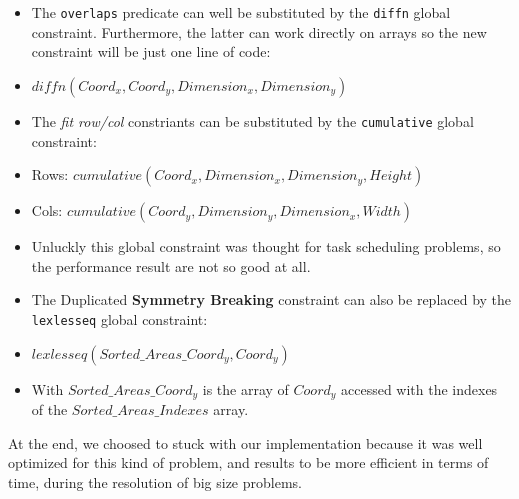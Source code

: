 \begin{itemize}
    \item The \texttt{overlaps} predicate can well be substituted by the \texttt{diffn} global constraint.
            Furthermore, the latter can work directly on arrays so the new constraint will be just one line of code:
    \item[] $diffn(Coord_x, Coord_y, Dimension_x, Dimension_y)$
    \item The \textit{fit row/col} constriants can be substituted by the \texttt{cumulative} global constraint:
    \item[] Rows: $cumulative(Coord_x, Dimension_x, Dimension_y, Height)$
    \item[] Cols: $cumulative(Coord_y, Dimension_y, Dimension_x, Width)$
    \item[] Unluckly this global constraint was thought for task scheduling problems, so the performance result are not so good at all.
    \item The Duplicated \textbf{Symmetry Breaking} constraint can also be replaced by the \texttt{lexlesseq} global constraint:
    \item[] $lexlesseq(Sorted\_Areas\_Coord_y, Coord_y)$
    \item[] With $Sorted\_Areas\_Coord_y$ is the array of $Coord_y$ accessed with the indexes of the $Sorted\_Areas\_Indexes$ array.   
\end{itemize}

At the end, we choosed to stuck with our implementation because it was well optimized for this kind of problem, and results to be more
efficient in terms of time, during the resolution of big size problems.

